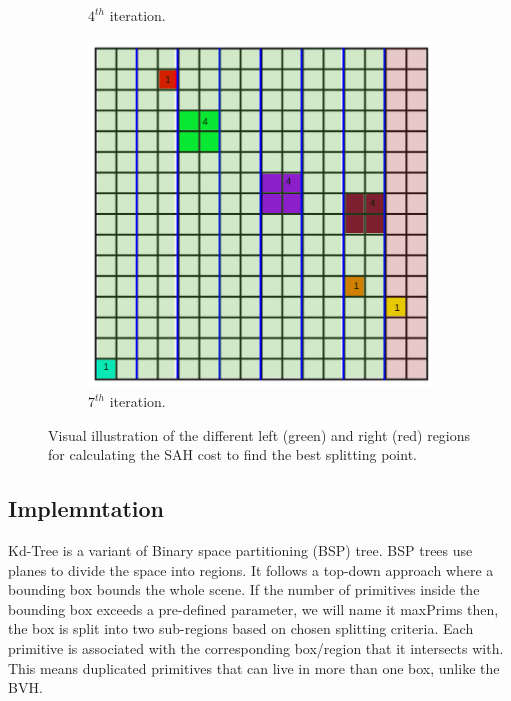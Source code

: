\documentclass[11pt,a4paper]{article}
\begin{document}
\begin{figure}[H]
\begin{subfigure}[b]{0.475\textwidth}
         \caption{$4^{th} $ iteration.}
         \label{fig:pi_18000}
     \end{subfigure}
     \hfill
     \begin{subfigure}[b]{0.475\textwidth}
         \centering
         \includegraphics[width=\textwidth]{images/kdtree/grid_8.png}
         \caption{$7^{th} $ iteration.}
         \label{fig:pi_18000}
     \end{subfigure}
        \caption{Visual illustration of the different left (green) and right (red) regions for calculating the SAH cost to find the best splitting point. }
        \label{fig:three graphs}
\end{figure}



\subsection{Implemntation}

Kd-Tree is a variant of Binary space partitioning (BSP) tree. BSP trees use planes to divide the space into regions. It follows a top-down approach where a bounding box bounds the whole scene. If the number of primitives inside the bounding box exceeds a pre-defined parameter, we will name it maxPrims then, the box is split into two sub-regions based on chosen splitting criteria. Each primitive is associated with the corresponding box/region that it intersects with. This means duplicated primitives that can live in more than one box, unlike the BVH.
\end{document}
